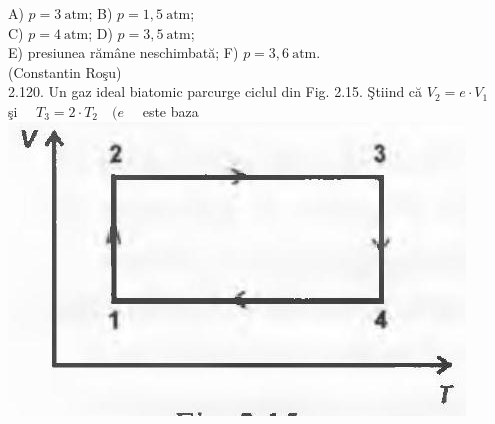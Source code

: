 \documentclass[10pt]{article}
\begin{document}
A) $p=3 \mathrm{~atm}$; B) $p=1,5 \mathrm{~atm}$;\\
C) $p=4 \mathrm{~atm}$; D) $p=3,5 \mathrm{~atm}$;\\
E) presiunea rămâne neschimbată; F) $p=3,6 \mathrm{~atm}$.\\
(Constantin Roşu)\\
2.120. Un gaz ideal biatomic parcurge ciclul din Fig. 2.15. Ştiind că $V_{2}=e \cdot V_{1} \quad$ şi $\quad T_{3}=2 \cdot T_{2} \quad(e \quad$ este baza\\
\includegraphics[max width=\textwidth, center]{2025_07_01_5b3ff9fa0d508c8e9f17g-100}
\end{document}
